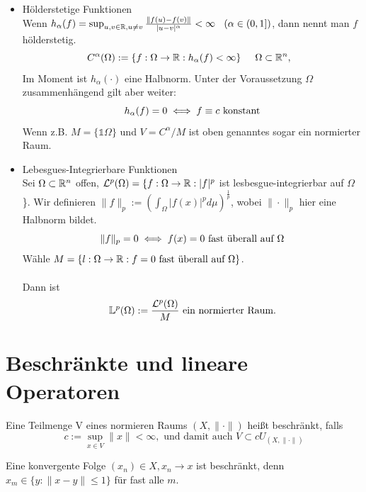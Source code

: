 \begin{beispiel}
\begin{itemize}
	\item Hölderstetige Funktionen \\
	Wenn $h_{\alpha}(f) = \sup_{u,v \in \mathbb{R}, u \neq v} \frac{\| f(u) - f(v)\|}{|u - v|^{\alpha}} < \infty \hspace{0.25cm} \left( \alpha \in (0, 1] \right)$, dann nennt man $f$ hölderstetig.
	\[ C^{\alpha}(\Omega) := \{ f: \Omega \rightarrow \mathbb{R}: h_{\alpha}(f) < \infty \} \hspace{0.5cm} \Omega \subset \mathbb{R}^{n}, \hspace{0.25cm} \]
	Im Moment ist $h_{\alpha}( \cdot )$ eine Halbnorm. Unter der Voraussetzung $\Omega$ zusammenhängend gilt aber weiter:
	\[ h_{\alpha}(f) = 0 \iff f \equiv c \text{ konstant} \]
	Wenn z.B. $M = \{ \mathds{1} \Omega \}$ und $V = C^{\alpha}/M$ ist oben genanntes sogar ein normierter Raum.
	\item Lebesgues-Integrierbare Funktionen \\
	Sei $\Omega \subset \mathbb{R}^{n}$ offen, $\mathcal{L}^{p}(\Omega) = \{ f: \Omega \rightarrow \mathbb{R} : |f|^{p}$ ist lesbesgue-integrierbar auf $\Omega$  \}.
	Wir definieren $\| f \|_{p} := \left( \int_{\Omega} |f(x)|^{p} d\mu \right)^{\frac{1}{p}}$, wobei $\| \cdot \|_{p}$ hier eine Halbnorm bildet.
	\[ \| f \|_{p} = 0 \iff  f(x) = 0 \text{ fast überall auf } \Omega \]
	Wähle $M = \{ l: \Omega \rightarrow \mathbb{R}: f = 0 \text{ fast überall auf } \Omega \}$. \\ \\
	Dann ist
	\[ \mathbb{L}^{p}(\Omega) := \frac{\mathcal{L}^{p}(\Omega)}{M} \text{ ein normierter Raum.} \]
\end{itemize}
\end{beispiel}


\newpage
\section{Beschränkte und lineare Operatoren}

\begin{definition}
	Eine Teilmenge V eines normieren Raums $(X, \| \cdot \|)$ hei{\ss}t beschränkt, falls 
	\[ c := \sup_{x \in V} \| x \| < \infty, \text{ und damit auch } V \subset c U_{(X, \| \cdot \| )} \]
\end{definition}

\begin{bemerkung}
Eine konvergente Folge $(x_{n})	\in X, x_{n} \rightarrow x$ ist beschränkt, denn $x_{m} \in \{ y: \| x - y \| \leq 1 \}$ für fast alle $m$.
\end{bemerkung}

